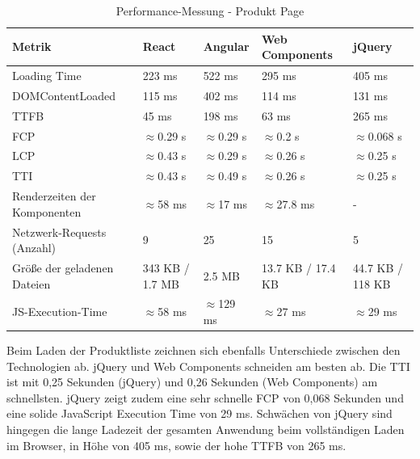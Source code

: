 \documentclass[oneside]{ausarbeitung}
\begin{document}
\begin{table}[H]
\centering
\caption{Performance-Messung - Produkt Page}
\begin{tabular}{|p{3.5cm}|p{2.5cm}|p{2.5cm}|p{2.5cm}|p{2.5cm}|}
\hline
\textbf{Metrik}                  & \textbf{React} & \textbf{Angular} & \textbf{Web Components} & \textbf{jQuery} \\ \hline
Loading Time                     & 223 ms        & 522 ms           & 295 ms                 & 405 ms          \\ \hline
DOMContentLoaded                 & 115 ms        & 402 ms           & 114 ms                 & 131 ms          \\ \hline
TTFB                             & 45 ms        & 198 ms           & 63 ms                  & 265 ms          \\ \hline
FCP                              & $\approx$0.29 s  & $\approx$0.29 s  & $\approx$0.2 s        & $\approx$0.068 s  \\ \hline
LCP                              & $\approx$0.43 s  & $\approx$0.29 s  & $\approx$0.26 s       & $\approx$0.25 s \\ \hline
TTI                              & $\approx$0.43 s  & $\approx$0.49 s  & $\approx$0.26 s       & $\approx$0.25 s \\ \hline
Renderzeiten der Komponenten     & $\approx$58 ms & $\approx$17 ms   & $\approx$27.8 ms          & -  \\ \hline
Netzwerk-Requests (Anzahl)       & 9              & 25               & 15                    & 5               \\ \hline
Größe der geladenen Dateien      & 343 KB / 1.7 MB & 2.5 MB          & 13.7 KB / 17.4 KB     & 44.7 KB / 118 KB \\ \hline
JS-Execution-Time                & $\approx$58 ms       & $\approx$129 ms          & $\approx$27 ms                & $\approx$29 ms         \\ \hline
\end{tabular}
\end{table}

Beim Laden der Produktliste zeichnen sich ebenfalls Unterschiede zwischen den Technologien ab. jQuery und Web Components schneiden am besten ab. Die TTI ist mit 0,25 Sekunden (jQuery) und 0,26 Sekunden (Web Components) am schnellsten. jQuery zeigt zudem eine sehr schnelle FCP von 0,068 Sekunden und eine solide JavaScript Execution Time von 29 ms. Schwächen von jQuery sind hingegen die lange Ladezeit der gesamten Anwendung beim vollständigen Laden im Browser, in Höhe von 405 ms, sowie der hohe \ac{TTFB} von 265 ms.
\end{document}
